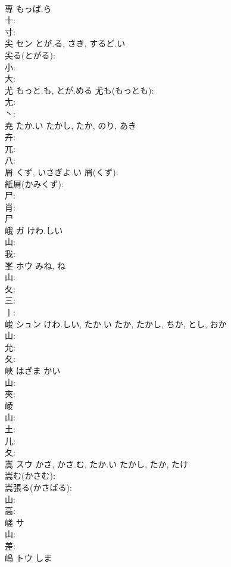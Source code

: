 \documentclass[8pt]{extreport}
\begin{document}
\begin{CJK}{UTF8}{min}
\\	專		もっぱ.ら				
\\	十: 
\\	寸: 
\\	尖	セン	とが.る, さき, するど.い		
\\	尖る(とがる): 
\\	小: 
\\	大: 
\\	尤		もっと.も, とが.める			尤も(もっとも): 
\\	尢: 
\\	丶: 
\\	尭		たか.い	たかし, たか, のり, あき			
\\	卉: 
\\	兀: 
\\	八: 
\\	屑		くず, いさぎよ.い			屑(くず): 
\\	紙屑(かみくず): 
\\	尸: 
\\	肖: 
\\	尸
\\	峨	ガ	けわ.しい		
\\	山: 
\\	我: 
\\	峯	ホウ	みね, ね		
\\	山: 
\\	夂: 
\\	三: 
\\	丨: 
\\	峻	シュン	けわ.しい, たか.い	たか, たかし, ちか, とし, おか	
\\	山: 
\\	允: 
\\	夂: 
\\	峽		はざま	かい			
\\	山: 
\\	夾: 
\\	崚						
\\	山: 
\\	土: 
\\	儿: 
\\	夂: 
\\	嵩	スウ	かさ, かさ.む, たか.い	たかし, たか, たけ	
\\	嵩む(かさむ): 
\\	嵩張る(かさばる): 
\\	山: 
\\	高: 
\\	嵯	サ			
\\	山: 
\\	差: 
\\	嶋	トウ	しま		

\end{CJK}
\end{document}
